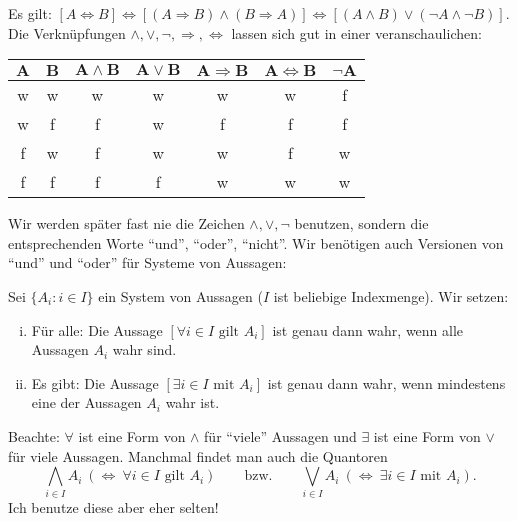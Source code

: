 Es gilt: $[A \Leftrightarrow B] \Leftrightarrow [(A \Rightarrow B) \wedge (B \Rightarrow A)] \Leftrightarrow [(A \wedge B) \vee (\neg A \wedge \neg B)]$.
Die Verknüpfungen $\wedge,\vee,\neg,\Rightarrow,\Leftrightarrow$ lassen sich gut in einer  veranschaulichen:

\begin{center}
	\begin{tabular}{ccccccc}
	$\bm{A}$ & $\bm{B}$ & $\bm{A \wedge B}$ & $\bm{A \vee B}$ & $\bm{A \Rightarrow B}$ & $\bm{A \Leftrightarrow B}$ & $\bm{\neg A}$ \\ 
	\hline w & w & w & w & w & w & f \\ 
	\hline w & f & f & w & f & f & f \\ 
	\hline f & w & f & w & w & f & w \\ 
	\hline f & f & f & f & w & w & w \\ 
\end{tabular} 
\end{center}

Wir werden später fast nie die Zeichen $\wedge, \vee, \neg$ benutzen, sondern die entsprechenden Worte \enquote{und}, \enquote{oder}, \enquote{nicht}.
Wir benötigen auch Versionen von \enquote{und} und \enquote{oder} für Systeme von Aussagen:

\begin{definition}
	\label{def:I.1.2}
	Sei $\{A_i : i \in I\}$ ein System von Aussagen ($I$ ist beliebige Indexmenge).
	Wir setzen:  
	\begin{enumerate}[(i)]
		\item Für alle: Die Aussage $[\forall i \in I \text{ gilt } A_i]$ ist genau dann wahr, wenn alle Aussagen $A_i$ wahr sind.
		\item Es gibt: Die Aussage $[\exists i \in I \text{ mit } A_i]$ ist genau dann wahr, wenn mindestens eine der Aussagen $A_i$ wahr ist.
	\end{enumerate}
\end{definition}

Beachte: $\forall$ ist eine Form von $\wedge$ für \enquote{viele} Aussagen und $\exists$ ist eine Form von $\vee$ für viele Aussagen.
Manchmal findet man auch die Quantoren
\[
	\bigwedge_{i \in I} A_i \ (\Leftrightarrow \ \forall i \in I \text{ gilt } A_i) \qquad \text{bzw.} \qquad \bigvee_{i \in I} A_i \ (\Leftrightarrow \ \exists i \in I \text{ mit } A_i).
\]
Ich benutze diese aber eher selten!

